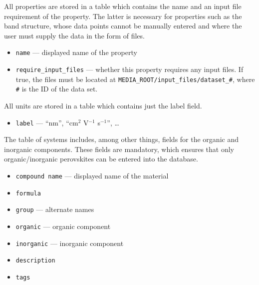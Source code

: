 \documentclass{article}
\begin{document}
All properties are stored in a table which contains the name and an input file requirement of the property. The latter is necessary for properties such as the band structure, whose data points cannot be manually entered and where the user must supply the data in the form of files.
\begin{tcolorbox}[colback=green!5,colframe=green!40!black,title=Property(Base)]
  \begin{itemize}
  \item \texttt{name} --- displayed name of the property
  \item \texttt{require\_input\_files} --- whether this property requires any input files. If true, the files must be located at \verb+MEDIA_ROOT/input_files/dataset_#+, where \verb+#+ is the ID of the data set.
  \end{itemize}
\end{tcolorbox}

All units are stored in a table which contains just the label field.
\begin{tcolorbox}[colback=green!5,colframe=green!40!black,title=Unit(Base)]
  \begin{itemize}
  \item \texttt{label} --- ``nm'', ``cm$^2$ V$^{-1}$ s$^{-1}$'', \ldots
  \end{itemize}
\end{tcolorbox}

The table of systems includes, among other things, fields for the organic and inorganic components. These fields are mandatory, which ensures that only organic/inorganic perovskites can be entered into the database.
\begin{tcolorbox}[colback=green!5,colframe=green!40!black,title=System(Base)]
  \begin{itemize}
  \item \texttt{compound name} --- displayed name of the material
  \item \texttt{formula}
  \item \texttt{group} --- alternate names
  \item \texttt{organic} --- organic component
  \item \texttt{inorganic} --- inorganic component
  \item \texttt{description}
  \item \texttt{tags}
  \end{itemize}
\end{tcolorbox}
\end{document}
